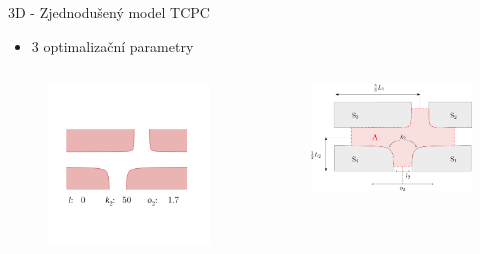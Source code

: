 \documentclass[aspectratio=169,xcolor=dvipsnames]{beamer}
\begin{document}
\begin{frame}{3D - Zjednodušený model TCPC}
	\addtocounter{framenumber}{-1}
	\begin{itemize}
		\item 3 optimalizační parametry
	\end{itemize}
	\begin{columns}
		\begin{column}{.58\textwidth}
			\begin{figure}
				\includegraphics[width=1.\linewidth, trim={5cm 6cm 8cm 19cm}, clip]{Images/c.png}		
			\end{figure}
		\end{column}
		\begin{column}{.42\textwidth}
			\vspace{-15mm}
			\begin{figure}
				\includegraphics[width=1.\linewidth, trim={0 0 0 0}, clip]{Images/krizovatka.pdf}		

\end{figure}
\end{column}
\end{columns}
\end{frame}
\end{document}
